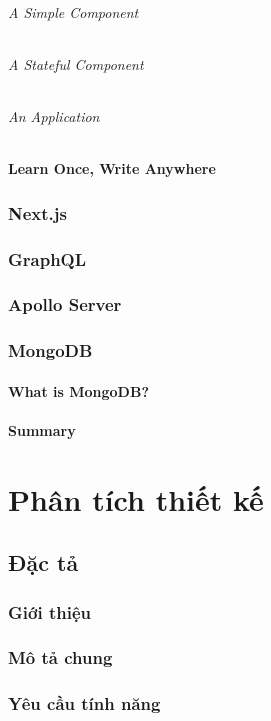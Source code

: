\documentclass{report}
\begin{document}
\paragraph{A Simple Component}
\paragraph{A Stateful Component}
\paragraph{An Application}
\subsection{Learn Once, Write Anywhere}
\section{Next.js}
\section{GraphQL}
\section{Apollo Server}
\section{MongoDB}
\subsection{What is MongoDB?}
\subsection{Summary}
\part{Phân tích thiết kế}
\chapter{Đặc tả}
\section{Giới thiệu}
\section{Mô tả chung}
\section{Yêu cầu tính năng}
\end{document}
